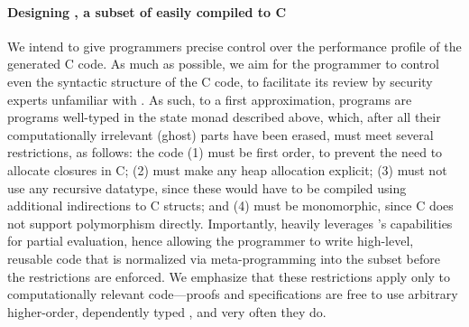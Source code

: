 \paragraph*{Designing \lowstar, a subset of \fstar easily compiled to C}
We intend to give \lowstar programmers precise control over the
performance profile of the generated C code. As much as possible, 
we aim for the programmer to control even the
syntactic structure of the C code, to
facilitate its review by security experts unfamiliar with \fstar. 
As such, to
a first approximation, \lowstar programs are \fstar programs
well-typed in the state monad described above, which, after all their
computationally irrelevant (ghost) parts have been erased, must
meet several restrictions, as follows: the code 
(1) must be first order, to prevent the need to allocate closures in C; 
(2) must make any heap allocation explicit; 
(3) must not use any recursive datatype, since these would have to be compiled using additional
indirections to C structs; and 
(4) must be monomorphic, since C does not support polymorphism directly. 
%
Importantly, \lowstar heavily leverages \fstar's capabilities for
partial evaluation, hence allowing the programmer to write high-level, reusable
code that is normalized via meta-programming into the \lowstar subset before
the restrictions are enforced.
%
We emphasize that these restrictions apply only to computationally
relevant code---proofs and specifications are free to use arbitrary
higher-order, dependently typed \fstar, and very often they do.




